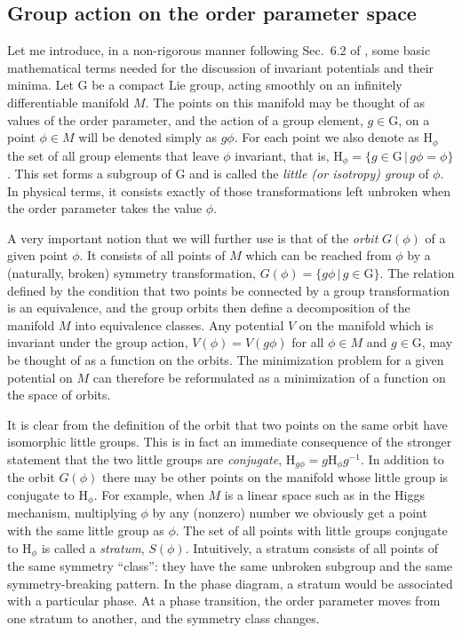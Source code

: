 \documentclass[final,2p,times,12pt,sort&compress]{elsarticle}
\newcommand\gr[1]{\mathrm{#1}}              %
\begin{document}
\subsection{Group action on the order parameter space}
\label{subsec:Michel} Let me introduce, in a non-rigorous manner following
Sec.~6.2 of \cite{Vollhardt:1990vw}, some basic mathematical terms needed for
the discussion of invariant potentials and their minima. Let $\gr G$ be a
compact Lie group, acting smoothly on an infinitely differentiable manifold $M$.
The points on this manifold may be thought of as values of the order parameter,
and the action of a group element, $g\in\gr G$, on a point $\phi\in M$ will be
denoted simply as $g\phi$. For each point we also denote as $\gr H_\phi$ the
set of all group elements that leave $\phi$ invariant, that is, $\gr
H_\phi=\{g\in\gr G\,|\,g\phi=\phi\}$. This set forms a subgroup of $\gr G$ and
is called the \emph{little (or isotropy) group} of $\phi$. In physical terms,
it consists exactly of those transformations left unbroken when the order
parameter takes the value $\phi$.

A very important notion that we will further use is that of the \emph{orbit}
$G(\phi)$ of a given point $\phi$. It consists of all points of $M$ which can
be reached from $\phi$ by a (naturally, broken) symmetry transformation,
$G(\phi)=\{g\phi\,|\,g\in\gr G\}$. The relation defined by the condition that
two points be connected by a group transformation is an equivalence, and
the group orbits then define a decomposition of the manifold $M$ into
equivalence classes. Any potential $V$ on the manifold which is invariant under
the group action, $V(\phi)=V(g\phi)$ for all $\phi\in M$ and $g\in\gr G$, may
be thought of as a function on the orbits. The minimization problem for a given
potential on $M$ can therefore be reformulated as a minimization of a function
on the space of orbits.

It is clear from the definition of the orbit that two points on the same orbit
have isomorphic little groups. This is in fact an immediate consequence of the
stronger statement that the two little groups are \emph{conjugate}, $\gr
H_{g\phi}=g\gr H_\phi g^{-1}$. In addition to the orbit $G(\phi)$ there may be
other points on the manifold whose little group is conjugate to $\gr H_\phi$.
For example, when $M$ is a linear space such as in the Higgs mechanism,
multiplying $\phi$ by any (nonzero) number we obviously get a point with the
same little group as $\phi$. The set of all points with little groups conjugate
to $\gr H_\phi$ is called a \emph{stratum}, $S(\phi)$. Intuitively, a stratum
consists of all points of the same symmetry ``class'': they have the same
unbroken subgroup and the same symmetry-breaking pattern. In the phase
diagram, a stratum would be associated with a particular phase. At a phase
transition, the order parameter moves from one stratum to another, and the
symmetry class changes.
\end{document}

